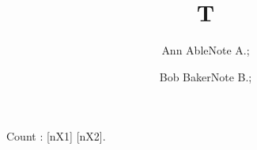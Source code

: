\documentclass{article}
\title{T}
\author{Ann Able\mymail{ann@x.org}\mynote Note A.; \and Bob Baker\mymail{bob@y.org}\mynote Note B.;}
\newcounter{ec}
\begin{document}
\maketitle
Count \theec: [\csname nX1\endcsname] [\csname nX2\endcsname].
\end{document}
